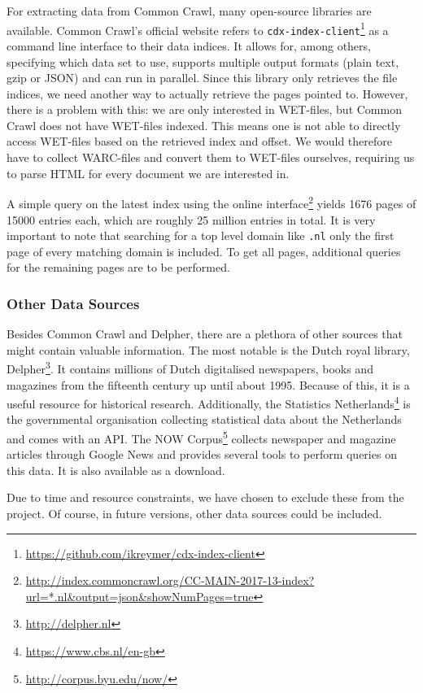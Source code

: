 For extracting data from Common Crawl, many open-source libraries are available. Common Crawl's official website refers to \texttt{cdx-index-client}\footnote{\url{https://github.com/ikreymer/cdx-index-client}} as a command line interface to their data indices. It allows for, among others, specifying which data set to use, supports multiple output formats (plain text, gzip or JSON) and can run in parallel. Since this library only retrieves the file indices, we need another way to actually retrieve the pages pointed to. However, there is a problem with this: we are only interested in WET-files, but Common Crawl does not have WET-files indexed. This means one is not able to directly access WET-files based on the retrieved index and offset. We would therefore have to collect WARC-files and convert them to WET-files ourselves, requiring us to parse HTML for every document we are interested in.

A simple query on the latest index using the online interface\footnote{\url{http://index.commoncrawl.org/CC-MAIN-2017-13-index?url=*.nl&output=json&showNumPages=true}} yields 1676 pages of 15000 entries each, which are roughly 25 million entries in total. It is very important to note that searching for a top level domain like \texttt{.nl} only the first page of every matching domain is included. To get all pages, additional queries for the remaining pages are to be performed.


\subsubsection{Other Data Sources}
Besides Common Crawl and Delpher, there are a plethora of other sources that might contain valuable information. The most notable is the Dutch royal library, Delpher\footnote{\url{http://delpher.nl}}. It contains millions of Dutch digitalised newspapers, books and magazines from the fifteenth century up until about 1995. Because of this, it is a useful resource for historical research. Additionally, the Statistics Netherlands\footnote{\url{https://www.cbs.nl/en-gb}} is the governmental organisation collecting statistical data about the Netherlands and comes with an API. The NOW Corpus\footnote{\url{http://corpus.byu.edu/now/}} collects newspaper and magazine articles through Google News and provides several tools to perform queries on this data. It is also available as a download. 

Due to time and resource constraints, we have chosen to exclude these from the project. Of course, in future versions, other data sources could be included.
